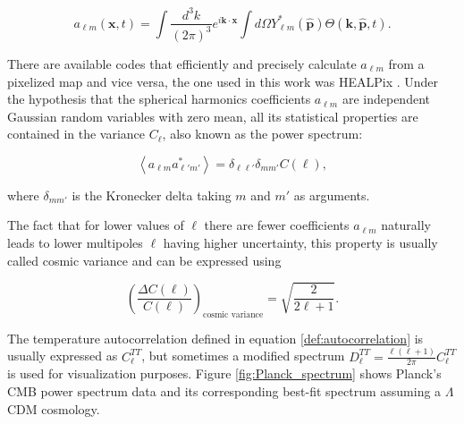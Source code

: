 \documentclass[openany,a4paper,12pt,oneside]{book}
\newcommand{\av}[1]{\left\langle #1 \right\rangle} %
\begin{document}
\begin{spacing}{1.5}
\begin{equation}\label{ch2:alm=int...}
    a_{\ell m}(\mathbf{x}, t)=\int \frac{d^3k}{(2\pi)^3}e^{i\mathbf{k}\cdot\mathbf{x}}\int d\Omega Y_{\ell m}^*(\hat{\mathbf{p}})\Theta(\mathbf{k}, \hat{\mathbf{p}}, t).
\end{equation}

There are available codes that efficiently and precisely calculate $a_{\ell m}$ from a pixelized map and vice versa, the one used in this work was HEALPix \cite{Healpix}. Under the hypothesis that the spherical harmonics coefficients $a_{\ell m}$ are independent Gaussian random variables with zero mean, all its statistical properties are contained in the variance $C_\ell$, also known as the power spectrum:

\begin{equation}\label{def:autocorrelation}
    \av{a_{\ell m} a^*_{\ell' m'}}=\delta_{\ell\ell'}\delta_{mm'}C(\ell),
\end{equation}

\noindent where $\delta_{mm'}$ is the Kronecker delta taking $m$ and $m'$ as arguments.

The fact that for lower values of $\ell$ there are fewer coefficients $a_{\ell m}$ naturally leads to lower multipoles $\ell$ having higher uncertainty, this property is usually called cosmic variance and can be expressed using \cite{dodelson2020modern} 

\begin{equation}\label{cosmic_variance}
    \left(\frac{\Delta C(\ell)}{C(\ell)}\right)_\text{cosmic variance}=\sqrt{\frac{2}{2\ell+1}}.
\end{equation}

The temperature autocorrelation defined in equation \eqref{def:autocorrelation} is usually expressed as $C_\ell^{TT}$, but sometimes a modified spectrum $D_\ell^{TT}=\frac{\ell(\ell+1)}{2\pi}C_\ell^{TT}$ is used for visualization purposes. Figure \ref{fig:Planck_spectrum} shows Planck's CMB power spectrum data and its corresponding best-fit spectrum assuming a $\Lambda$CDM cosmology.


\end{spacing}
\end{document}
